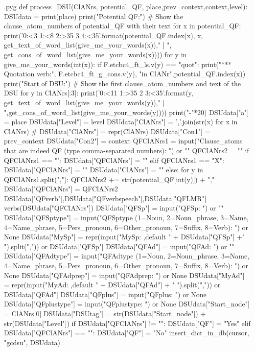 \documentclass{report}
\makeatletter
\newenvironment{python}{%
  \VerbatimEnvironment
  \minted@resetoptions
  \setkeys{minted@opt}{}
      \begin{VerbatimOut}{\jobname.pyg}}
{%
      \end{VerbatimOut}
      \minted@pygmentize{python}
      \DeleteFile{\jobname.pyg}}
\makeatother
\begin{document}
\begin{python}
def process_DSU(ClANrs, potential_QF, place,prev_context,context,level):
    DSUdata = {}
    print(place)
    print("Potential QF:")  # Show the clause_atom_numbers of potential_QF with their text
    for x in potential_QF:
        print('{0:<3} {1:<8} {2:>35} {3} {4:<35}'.format(potential_QF.index(x), x, get_text_of_word_list(give_me_your_words(x))," | ", get_cons_of_word_list(give_me_your_words(x))))
        for y in give_me_your_words(int(x)):
            if F.etcbc4_ft_ls.v(y) == "quot":
                print("*** Quotation verb:", F.etcbc4_ft_g_cons.v(y), "in ClANr",potential_QF.index(x))
    print("Start of DSU:")  # Show the first clause_atom_numbers and text of the DSU
    for y in ClANrs[:3]:
        print('{0:<11} {1:>35} {2} {3:<35}'.format(y, get_text_of_word_list(give_me_your_words(y))," | ",get_cons_of_word_list(give_me_your_words(y))))
    print("-"*20)
    DSUdata["a"] = place
    DSUdata["Level"] = level
    DSUdata["ClANrs"] = ','.join(str(x) for x in ClANrs)
#    DSUdata["ClANrs"] = repr(ClANrs)
    DSUdata["Con1"] = prev_context
    DSUdata["Con2"] = context
    QFClANrs1 = input("Clause_atoms that are indeed QF (type comma-separated numbers): ") or ""
    QFClANrs2 = ""
    if QFClANrs1 == "":
        DSUdata["QFClANrs"] = ""
    elif QFClANrs1 == "X":
        DSUdata["QFClANrs"] = ""
        DSUdata["ClANrs"] = ""
    else:
        for y in QFClANrs1.split(","):
            QFClANrs2 += str(potential_QF[int(y)]) + ","
        DSUdata["QFClANrs"] = QFClANrs2
    DSUdata["QFverb"],DSUdata["QFverbspeech"],DSUdata["QFLMR"] = verbs(DSUdata["QFClANrs"])
    DSUdata["QFSp"] = input("QFSp: ") or ""
    DSUdata["QFSptype"] = input("QFSptype (1=Noun, 2=Noun_phrase, 3=Name, 4=Name_phrase, 5=Pers_pronoun, 6=Other_pronoun, 7=Suffix, 8=Verb): ") or None
    DSUdata["MySp"] = repr(input("MySp: ,default " + DSUdata["QFSp"] +" ").split(",")) or DSUdata["QFSp"]
    DSUdata["QFAd"] = input("QFAd: ") or ""
    DSUdata["QFAdtype"] = input("QFAdtype (1=Noun, 2=Noun_phrase, 3=Name, 4=Name_phrase, 5=Pers_pronoun, 6=Other_pronoun, 7=Suffix, 8=Verb): ") or None
    DSUdata["QFAdprep"] = input("QFAdprep: ") or None
    DSUdata["MyAd"] = repr(input("MyAd: ,default " + DSUdata["QFAd"] + " ").split(",")) or DSUdata["QFAd"]
    DSUdata["QFplus"] = input("QFplus: ") or None
    DSUdata["QFplustype"] = input("QFplustype: ") or None
    DSUdata["Start_node"] = ClANrs[0]
    DSUdata["DSUtag"] = str(DSUdata["Start_node"]) + str(DSUdata["Level"])
    if DSUdata["QFClANrs"] != "":
        DSUdata["QF"] = "Yes"
    elif DSUdata["QFClANrs"] == "":
        DSUdata["QF"] = "No"
    insert_dict_in_db(cursor, "gcdsu", DSUdata)

\end{python}
\end{document}
